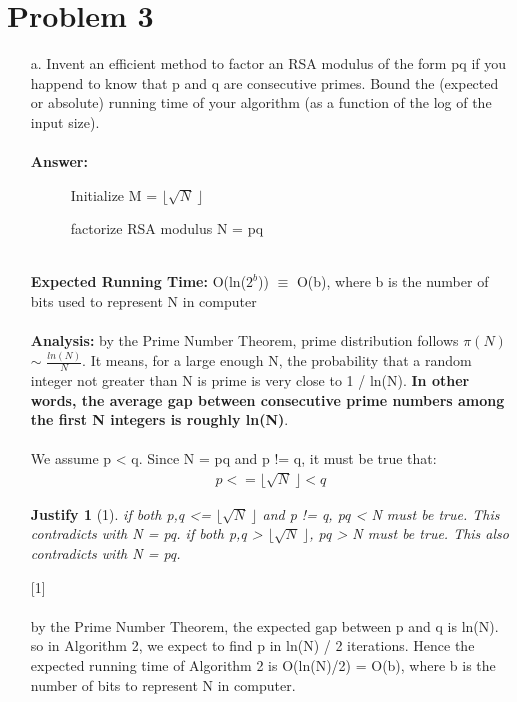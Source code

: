\documentclass[12pt,letterpaper]{article}
\newtheorem*{justify}{Justify}
\begin{document}
\section*{Problem 3}
\setcounter{equation}{0}
\begin{enumerate}
    \item[a.]
      Invent an efficient method to factor an RSA modulus of the form pq if you happend to know that p and q are consecutive primes. Bound the (expected or absolute) running time of your algorithm (as a function of the log of the input size).\\ \\

    \textbf{Answer:} 
    \begin{figure}[ht]
      \centering
      \begin{minipage}{.7\linewidth}
        \begin{algorithm}[H]
        \SetAlgoLined
          Initialize M = $\lfloor\sqrt{N} \ \rfloor$ 
          
         \caption{factorize RSA modulus N = pq}
        \end{algorithm}
      \end{minipage}
    \end{figure} \\
    \textbf{Expected Running Time:} O(ln($2^{b}$)) $\equiv$ O(b), where b is the number of bits used to represent N in computer\\\\
    \textbf{Analysis:}
    by the Prime Number Theorem, prime distribution follows $\pi(N)$ $\sim$ $\frac{ln(N)}{N}$. It means, for a large enough N, the probability that a random integer not greater than N is prime is very close to 1 / ln(N).  \textbf{In other words, the average gap between consecutive prime numbers among the first N integers is roughly ln(N)}.\\\\
    We assume p < q. Since N = pq and p != q, it must be true that:
    \begin{align}
      p <= \lfloor\sqrt{N} \ \rfloor  < q
    \end{align}
    \begin{justify}[1]
    if both p,q <= $\lfloor\sqrt{N} \ \rfloor$ and p != q, pq < N must be true.  This contradicts with N = pq.  if both p,q > $\lfloor\sqrt{N} \ \rfloor$, pq > N must be true.  This also contradicts with N = pq.
    \end{justify}[1] \\\\
    by the Prime Number Theorem, the expected gap between p and q is ln(N).  so in Algorithm 2, we expect to find p in ln(N) / 2 iterations.  Hence the expected running time of Algorithm 2 is O(ln(N)/2) = O(b), where b is the number of bits to represent N in computer.\\\\
    

\end{enumerate}
\end{document}
